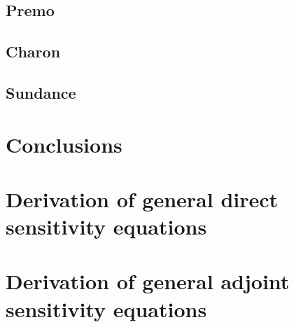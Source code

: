 \documentclass[pdf,ps2pdf,11pt]{SANDreport}
\begin{document}
\subsection{Premo}

\subsection{Charon}

\subsection{Sundance}

\section{Conclusions}

%
\clearpage
%
%

%
\appendix

\section{Derivation of general direct sensitivity equations}

\section{Derivation of general adjoint sensitivity equations}

\begin{SANDdistribution}
\end{SANDdistribution}
\end{document}
